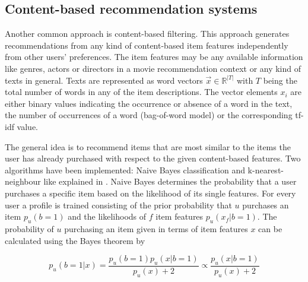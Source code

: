 \documentclass[10pt]{reportMaster}
\begin{document}





\subsection{Content-based recommendation systems}
\label{rs_cb}

Another common approach is content-based filtering.
This approach generates recommendations from any kind of content-based item features independently from other users' preferences.
The item features may be any available information like genres, actors or directors in a movie recommendation context or any kind of texts in general.
Texts are represented as word vectors $\vec{x} \in \mathds{R}^{|T|}$ with $T$ being the total number of words in any of the item descriptions.
The vector elements $x_i$ are either binary values indicating the occurrence or absence of a word in the text, the number of occurrences of a word (bag-of-word model) or the corresponding tf-idf value. %

The general idea is to recommend items that are most similar to the items the user has already purchased with respect to the given content-based features.
Two algorithms have been implemented: Naive Bayes classification and k-nearest-neighbour like explained in \cite{contentbasedPazzani}.
Naive Bayes determines the probability that a user purchases a specific item based on the likelihood of its single features.
For every user a profile is trained consisting of the prior probability that $u$ purchases an item $p_u(b=1)$ and  the likelihoods of $f$ item features $p_u(x_f|b=1)$.
The probability of $u$ purchasing an item given in terms of item features $x$ can be calculated using the Bayes theorem by 

\begin{equation}
\label{BayesPost}
	p_u(b=1|x) = \frac{p_u(b=1) p_u(x|b=1)}{p_u(x)+2} \propto \frac{p_u(x|b=1)}{p_u(x)+2}
\end{equation}
\end{document}
